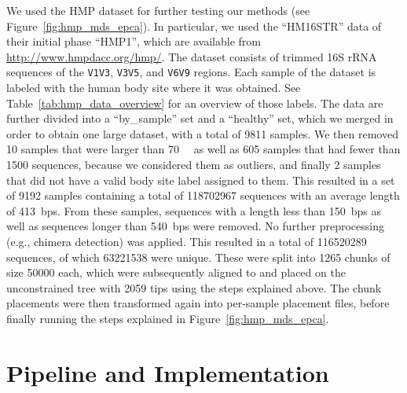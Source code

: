 We used the \acf{HMP} dataset \citep{Huttenhower2012,Methe2012} for further testing our methods
(see Figure~\ref{fig:hmp_mds_epca}).
In particular, we used the ``HM16STR'' data of their initial phase ``HMP1'',
which are available from \url{http://www.hmpdacc.org/hmp/}.
The dataset consists of trimmed 16S rRNA sequences of the \texttt{V1V3}, \texttt{V3V5}, and \texttt{V6V9} regions.
Each sample of the dataset is labeled with the human body site where it was obtained.
See Table~\ref{tab:hmp_data_overview} for an overview of those labels.
The data are further divided into a ``by\_sample'' set and a ``healthy'' set,
which we merged in order to obtain one large dataset, with a total of \num{9 811} samples.
We then removed \num{10} samples that were larger than \SI{70}{\mega\byte}
as well as \num{605} samples that had fewer than \num{1 500} sequences,
because we considered them as outliers,
and finally \num{2} samples that did not have a valid body site label assigned to them.
This resulted in a set of \num{9192} samples
containing a total of \num{118 702 967} sequences with an average length of \SI{413}{bps}.
From these samples, sequences with a length less than \SI{150}{bps}
as well as sequences longer than \SI{540}{bps} were removed.
No further preprocessing (e.g., chimera detection) was applied.
This resulted in a total of \num{116 520 289} sequences, of which \num{63 221 538} were unique.
These were split into \num{1 265} chunks of size \num{50 000} each, which were subsequently aligned to and
placed on the unconstrained  tree with \num{2 059} tips using the steps explained above.
The chunk placements were then transformed again into per-sample placement files,
before finally running the steps explained in Figure~\ref{fig:hmp_mds_epca}.


\cleardoublepage

\chapter{Pipeline and Implementation}
\label{ch:PipelineImplementation}

